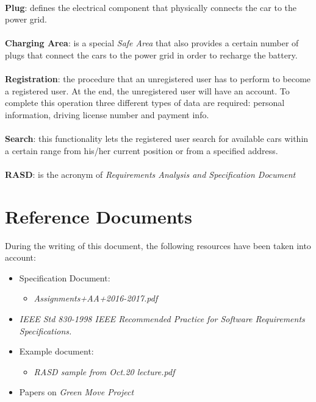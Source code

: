 \documentclass[11pt,a4paper]{report}
\begin{document}
\noindent \\
\textbf{Plug}: defines the electrical component that physically connects the car to the power grid.\\ 
\noindent \\
\textbf{Charging Area}: is a special \textit{Safe Area} that also provides a certain number of plugs that connect the cars to the power grid in order to recharge the battery.\\
\noindent \\
\textbf{Registration}: the procedure that an unregistered user has to perform to become a registered user. At the end, the unregistered user will have an account. To complete this operation three different types of data are required: personal information, driving license number and payment info.\\
\noindent \\
\textbf{Search}: this functionality lets the registered user search for available cars within a certain range from his/her current position or from a specified address.\\
\noindent \\
\textbf{RASD}: is the acronym of \textit{Requirements Analysis and Specification Document}

\section{Reference Documents}
During the writing of this document, the following resources have been taken into account:
	\begin{itemize}
		\item Specification Document:
		\begin{itemize}
			\item \textit{Assignments+AA+2016-2017.pdf}
		\end{itemize}
		\item \textit{IEEE Std 830-1998 IEEE Recommended Practice for Software Requirements Specifications.}
		\item Example document:
		\begin{itemize}
			\item \textit{RASD sample from Oct.20 lecture.pdf}
		\end{itemize}
		\item Papers on \textit{Green Move Project}
	\end{itemize}
	
\end{document}
